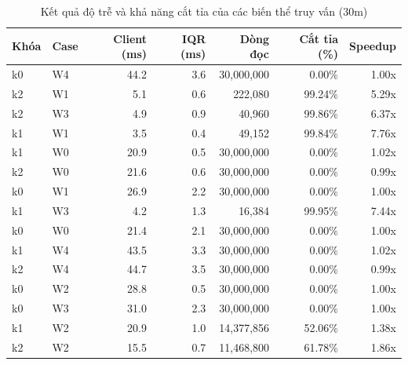 \begin{table}[htbp]
\centering
\caption{Kết quả độ trễ và khả năng cắt tỉa của các biến thể truy vấn (30m)}
\label{tab:queries_30m}
\begin{tabular}{llrrrrr}
\toprule
\textbf{Khóa} & \textbf{Case} & \textbf{Client (ms)} & \textbf{IQR (ms)} & \textbf{Dòng đọc} & \textbf{Cắt tỉa (\%)} & \textbf{Speedup} \\
\midrule
    k0 & W4 & 44.2 & 3.6 & 30,000,000 & 0.00\% & 1.00x \\
    k2 & W1 & 5.1 & 0.6 & 222,080 & 99.24\% & 5.29x \\
    k2 & W3 & 4.9 & 0.9 & 40,960 & 99.86\% & 6.37x \\
    k1 & W1 & 3.5 & 0.4 & 49,152 & 99.84\% & 7.76x \\
    k1 & W0 & 20.9 & 0.5 & 30,000,000 & 0.00\% & 1.02x \\
    k2 & W0 & 21.6 & 0.6 & 30,000,000 & 0.00\% & 0.99x \\
    k0 & W1 & 26.9 & 2.2 & 30,000,000 & 0.00\% & 1.00x \\
    k1 & W3 & 4.2 & 1.3 & 16,384 & 99.95\% & 7.44x \\
    k0 & W0 & 21.4 & 2.1 & 30,000,000 & 0.00\% & 1.00x \\
    k1 & W4 & 43.5 & 3.3 & 30,000,000 & 0.00\% & 1.02x \\
    k2 & W4 & 44.7 & 3.5 & 30,000,000 & 0.00\% & 0.99x \\
    k0 & W2 & 28.8 & 0.5 & 30,000,000 & 0.00\% & 1.00x \\
    k0 & W3 & 31.0 & 2.3 & 30,000,000 & 0.00\% & 1.00x \\
    k1 & W2 & 20.9 & 1.0 & 14,377,856 & 52.06\% & 1.38x \\
    k2 & W2 & 15.5 & 0.7 & 11,468,800 & 61.78\% & 1.86x \\
\bottomrule
\end{tabular}
\end{table}
